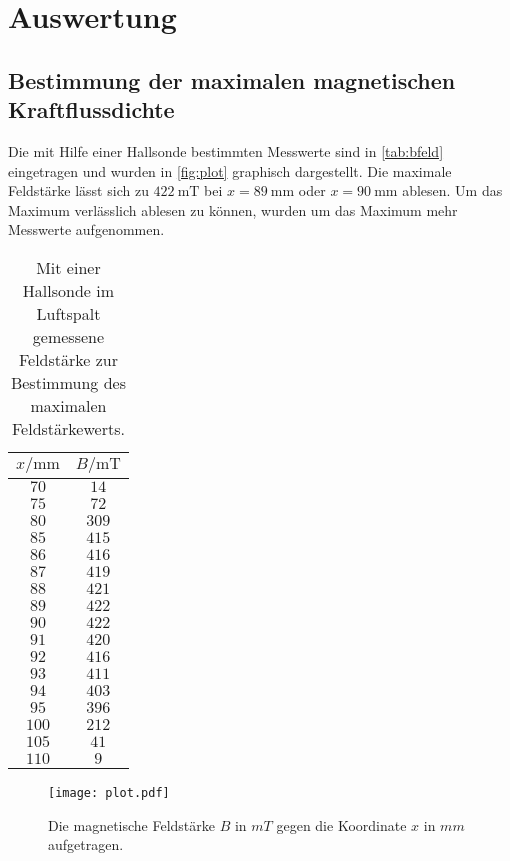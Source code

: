 \section{Auswertung}
\label{sec:Auswertung}

\subsection{Bestimmung der maximalen magnetischen Kraftflussdichte}
Die mit Hilfe einer Hallsonde bestimmten Messwerte sind in \autoref{tab:bfeld} eingetragen und wurden in
\autoref{fig:plot} graphisch dargestellt. Die maximale Feldstärke lässt sich zu $\SI{422}{\milli\tesla}$
bei $x=\SI{89}{\milli\meter}$ oder $x=\SI{90}{\milli\meter}$ ablesen. Um das Maximum verlässlich ablesen
zu können, wurden um das Maximum mehr Messwerte aufgenommen.

\begin{table}[hbt!]
  \centering
  \caption{Mit einer Hallsonde im Luftspalt gemessene Feldstärke zur Bestimmung des maximalen Feldstärkewerts.}
  \label{tab:bfeld}
  \begin{tabular}{c c}
    \toprule
    $x/\si{\milli\meter}$ & $B/\si{\milli\tesla}$\\
    \midrule
    $ 70$ & $ 14$ \\
    $ 75$ & $ 72$ \\
    $ 80$ & $309$ \\
    $ 85$ & $415$ \\
    $ 86$ & $416$ \\
    $ 87$ & $419$ \\
    $ 88$ & $421$ \\
    $ 89$ & $422$ \\
    $ 90$ & $422$ \\
    $ 91$ & $420$ \\
    $ 92$ & $416$ \\
    $ 93$ & $411$ \\
    $ 94$ & $403$ \\
    $ 95$ & $396$ \\
    $100$ & $212$ \\
    $105$ & $ 41$ \\
    $110$ & $  9$ \\
    \bottomrule
  \end{tabular}
\end{table}

\begin{figure}[hbt!]
  \centering
  \texttt{[image: plot.pdf]}
  \caption{Die magnetische Feldstärke $B$ in $mT$ gegen die Koordinate $x$ in $mm$ aufgetragen.}
  \label{fig:plot}
\end{figure}
\newpage

